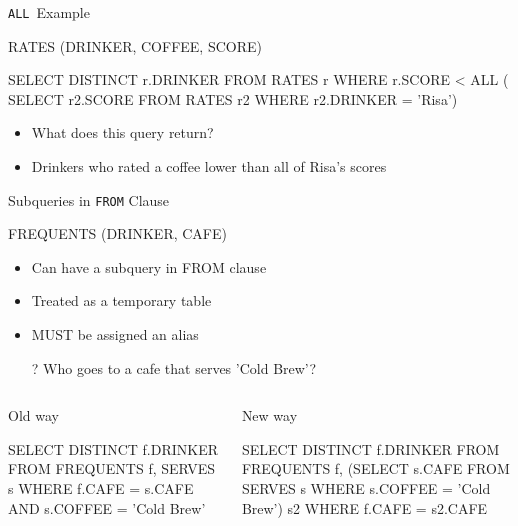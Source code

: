 \documentclass[aspectratio=169]{beamer}
\newcommand{\ALL}{\texttt{ALL}}
\begin{document}
\begin{frame}[fragile]{\ALL\ Example}

RATES (DRINKER, COFFEE, SCORE)

\begin{SQL}
SELECT DISTINCT r.DRINKER
FROM RATES r
WHERE r.SCORE < ALL (
 SELECT r2.SCORE
  FROM RATES r2
  WHERE r2.DRINKER = 'Risa')
\end{SQL}

\begin{itemize}
\item What does this query return? 
\item Drinkers who rated a coffee lower than all of Risa's scores
\end{itemize}
\end{frame}


\begin{frame}[fragile]{Subqueries in \texttt{FROM} Clause}

FREQUENTS (DRINKER, CAFE)

\begin{itemize}
\item Can have a subquery in FROM clause
\item Treated as a temporary table
\item MUST be assigned an alias
\item[?] Who goes to a cafe that serves 'Cold Brew'?
\end{itemize}

\begin{columns}[T]
\begin{column}{0.5\textwidth}
Old way\\
\begin{SQL}
SELECT DISTINCT f.DRINKER
FROM FREQUENTS f, SERVES s
WHERE f.CAFE = s.CAFE 
	AND s.COFFEE = 'Cold Brew'
\end{SQL}
\end{column}
\begin{column}{0.5\textwidth}
New way\\
\begin{SQL}
SELECT DISTINCT f.DRINKER
FROM FREQUENTS f, 
   (SELECT s.CAFE FROM SERVES s 			
    WHERE s.COFFEE = 'Cold Brew') s2
WHERE f.CAFE = s2.CAFE
\end{SQL}
\end{column}
\end{columns}
\end{frame}
\end{document}
